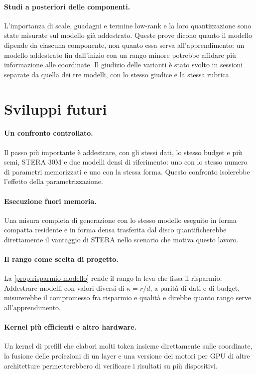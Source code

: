 \paragraph{Studi a posteriori delle componenti.} L'importanza di scale, guadagni e termine low-rank e la loro quantizzazione sono state misurate sul modello già addestrato. Queste prove dicono quanto il modello dipende da ciascuna componente, non quanto essa serva all'apprendimento: un modello addestrato fin dall'inizio con un rango minore potrebbe affidare più informazione alle coordinate. Il giudizio delle varianti è stato svolto in sessioni separate da quella dei tre modelli, con lo stesso giudice e la stessa rubrica.

\section{Sviluppi futuri}

\paragraph{Un confronto controllato.} Il passo più importante è addestrare, con gli stessi dati, lo stesso budget e più semi, STERA 30M e due modelli densi di riferimento: uno con lo stesso numero di parametri memorizzati e uno con la stessa forma. Questo confronto isolerebbe l'effetto della parametrizzazione.

\paragraph{Esecuzione fuori memoria.} Una misura completa di generazione con lo stesso modello eseguito in forma compatta residente e in forma densa trasferita dal disco quantificherebbe direttamente il vantaggio di STERA nello scenario che motiva questo lavoro.

\paragraph{Il rango come scelta di progetto.} La \autoref{prop:risparmio-modello} rende il rango la leva che fissa il risparmio. Addestrare modelli con valori diversi di $\kappa=r/d$, a parità di dati e di budget, misurerebbe il compromesso fra risparmio e qualità e direbbe quanto rango serve all'apprendimento.

\paragraph{Kernel più efficienti e altro hardware.} Un kernel di prefill che elabori molti token insieme direttamente sulle coordinate, la fusione delle proiezioni di un layer e una versione dei motori per GPU di altre architetture permetterebbero di verificare i risultati su più dispositivi.

